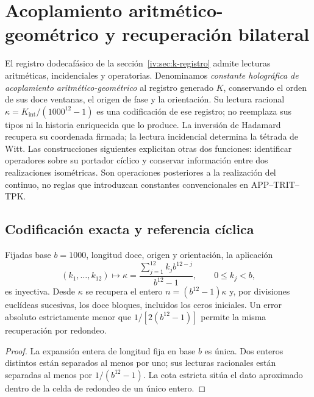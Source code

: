 \section{Acoplamiento aritmético-geométrico y recuperación bilateral}
\label{iv:sec:acoplamiento-recuperacion}

El registro dodecafásico de la sección~\ref{iv:sec:k-registro} admite
lecturas aritméticas, incidenciales y operatorias. Denominamos
\emph{constante holográfica de acoplamiento aritmético-geométrico}
al registro generado \(K\), conservando el orden de sus doce ventanas,
el origen de fase y la orientación. Su lectura racional
\(\kappa=K_{\mathrm{int}}/(1000^{12}-1)\) es una codificación de ese
registro; no reemplaza sus tipos ni la historia enriquecida que lo produce.
La inversión de Hadamard recupera su coordenada firmada; la lectura
incidencial determina la tétrada de Witt. Las construcciones siguientes
explicitan otras dos funciones: identificar operadores sobre su portador
cíclico y conservar información entre dos realizaciones isométricas.
Son operaciones posteriores a la realización del continuo, no reglas
que introduzcan constantes convencionales en APP--TRIT--TPK.

\subsection{Codificación exacta y referencia cíclica}
\label{iv:subsec:acoplamiento-codigo}

\begin{proposition}
Fijadas base \(b=1000\), longitud doce, origen y orientación, la aplicación
\[
 (k_1,\ldots,k_{12})\longmapsto
 \kappa=\frac{\sum_{j=1}^{12}k_jb^{12-j}}{b^{12}-1},
 \qquad 0\leq k_j<b,
\]
es inyectiva. Desde \(\kappa\) se recupera el entero
\(n=(b^{12}-1)\kappa\) y, por divisiones euclídeas sucesivas, los doce
bloques, incluidos los ceros iniciales. Un error absoluto estrictamente
menor que \(1/[2(b^{12}-1)]\) permite la misma recuperación por redondeo.
\end{proposition}
\begin{proof}
La expansión entera de longitud fija en base \(b\) es única. Dos enteros
distintos están separados al menos por uno; sus lecturas racionales
están separadas al menos por \(1/(b^{12}-1)\). La cota estricta sitúa el
dato aproximado dentro de la celda de redondeo de un único entero.
\end{proof}

